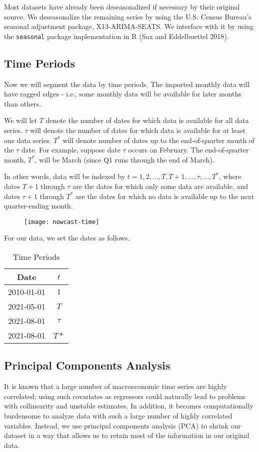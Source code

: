 \documentclass[11pt, letterpaper]{article}\usepackage[]{graphicx}\usepackage[]{color}
\begin{document}
Most datasets have already been deseasonalized if necessary by their original source. We deseasonalize the remaining series by using the U.S. Census Bureau's seasonal adjustment package, X13-ARIMA-SEATS. We interface with it by using the \texttt{seasonal} package implementation in R (Sax and Eddelbuettel 2018).

\subsection{Time Periods}
Now we will segment the data by time periods. The imported monthly data will have ragged edges - i.e., some monthly data will be available for later months than others.

We will let $T$ denote the number of dates for which data is available for all data series. $\tau$ will denote the number of dates for which data is available for at least one data series. $T^*$ will denote number of dates up to the end-of-quarter month of the $\tau$ date. For example, suppose date $\tau$ occurs on February. The end-of-quarter month, $T^*$, will be March (since Q1 runs through the end of March). 

In other words, data will be indexed by $t = 1, 2, \dots, T, T+1, \dots, \tau, \dots, T^*$, where dates $T + 1$ through $\tau$ are the dates for which only some data are available, and dates $\tau + 1$ through $T^*$ are the dates for which no data is available up to the next quarter-ending month.
\begin{figure}[H]
\texttt{[image: nowcast-time]}
\centering
\end{figure}
For our data, we set the dates as follows.
\begin{table}[H]
\centering
\begingroup\footnotesize
\begin{tabular}{cc}
  \hline
Date & $t$ \\ 
  \hline
2010-01-01 & $1$ \\ 
  2021-05-01 & $T$ \\ 
  2021-08-01 & $\tau$ \\ 
  2021-08-01 & $T*$ \\ 
   \hline
\end{tabular}
\endgroup
\caption{Time Periods} 
\end{table}


\subsection{Principal Components Analysis}
It is known that a large number of macroeconomic time series are highly correlated; using such covariates as regressors could naturally lead to problems with collinearity and unstable estimates. In addition, it becomes computationally burdensome to analyze data with such a large number of highly correlated variables. Instead, we use principal components analysis (PCA) to shrink our dataset in a way that allows us to retain most of the information in our original data.
\end{document}
